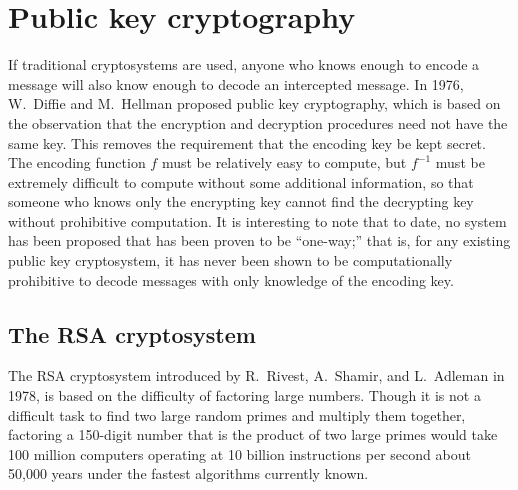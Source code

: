 \section{Public key cryptography}
  
If traditional cryptosystems are used, anyone who knows enough to
encode a message will also know enough to decode an intercepted
message. In 1976, W.~Diffie and
M.~Hellman proposed public key cryptography, which
is based on the observation that the encryption and decryption
procedures need not have the same key. This removes the requirement
that the encoding key be kept secret. The encoding function $f$ must
be relatively easy to compute, but $f^{-1}$ must be extremely
difficult to compute without some additional information, so that
someone who knows only the encrypting key cannot find the decrypting
key without prohibitive computation. It is interesting to note that to
date, no system has been proposed that has been proven to be
``one-way;'' that is, for any existing public key cryptosystem, it has
never been shown to be computationally prohibitive to decode messages
with only knowledge of the encoding key. 
 
 
 
\subsection{The RSA cryptosystem}\label{sec:RSA}
 
The RSA cryptosystem introduced by R.~Rivest,
A.~Shamir, and L.~Adleman in
1978, is based on the difficulty of factoring large numbers. Though it
is not a difficult task to find two large random primes and multiply
them together, factoring a 150-digit number that is the product of two
large primes would take 100 million computers operating at 10 billion
instructions per second about 50,000 years under the fastest
algorithms currently known.
 
